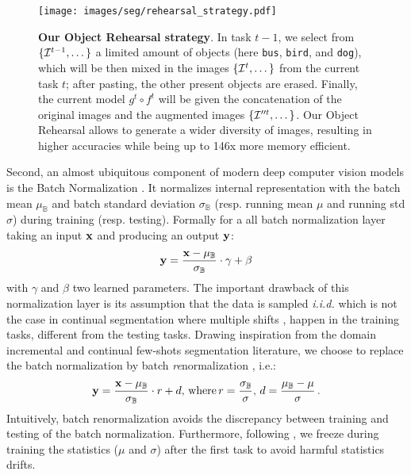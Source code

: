 \begin{figure}[ht!]
    \centering
    \texttt{[image: images/seg/rehearsal\_strategy.pdf]}
    \caption{\textbf{Our Object Rehearsal strategy}. In task $t-1$, we select from $\{\mathcal{I}^{t-1},
            \dots \}$ a limited amount of objects (here \texttt{bus}, \texttt{bird}, and
        \texttt{dog}), which will be then mixed in the images $\{\mathcal{I}^{t}, \dots \}$ from the
        current task $t$; after pasting, the other present objects are erased. Finally, the
        current model $g^t \circ f^t$ will be given the concatenation of the original images
        and the augmented images $\{\mathcal{I}''^t, \dots\}$. Our Object Rehearsal allows to generate
        a wider diversity of images, resulting in higher accuracies while being up to 146x more
        memory efficient.}
    \label{fig:seg_model_objectrehearsal}
\end{figure}

Second, an almost ubiquitous component of modern deep computer vision models is the Batch
Normalization \citep{ioffe2015batchnorm}. It normalizes internal representation with the batch mean
$\mu_\mathbb{B}$ and batch standard deviation $\sigma_\mathbb{B}$ (resp. running mean $\mu$ and
running std $\sigma$) during training (resp. testing). Formally for a all batch normalization layer
taking an input $\mathbf{x}$ and producing an output $\mathbf{y}$:
%
\begin{equation}
    \mathbf{y} = \frac{\mathbf{x} - \mu_\mathbb{B}}{\sigma_\mathbb{B}} \cdot \gamma + \beta
    \label{eq:seg_batch_norm}
\end{equation}
%
with $\gamma$ and $\beta$ two learned parameters. The important drawback of this normalization layer
is its assumption that the data is sampled \textit{i.i.d.} which is not the case in continual
segmentation where multiple shifts
\citep{morenotorresa2012datasetshift,lesort2021driftanalysis,douillardlesort2021continuum}, happen in
the training tasks, different from the testing tasks. Drawing inspiration from the domain
incremental \citep{lomonaco2020ar1} and continual few-shots segmentation
\citep{cermelli2020fewshotcontinualsegm} literature, we choose to replace the batch normalization by
batch \textit{re}normalization \citep{ioffe2017batchrenorm}, i.e.:
%
\begin{equation}
    \mathbf{y} = \frac{\mathbf{x} - \mu_\mathbb{B}}{\sigma_\mathbb{B}} \cdot r + d,\,\text{where}\, r = \frac{\sigma_\mathbb{B}}{\sigma},\, d = \frac{\mu_\mathbb{B} - \mu}{\sigma}\,.
    \label{eq:seg_batch_renorm}
\end{equation}
%
Intuitively, batch renormalization avoids the discrepancy between training and testing of the batch
normalization. Furthermore, following \cite{cermelli2020fewshotcontinualsegm}, we freeze during
training the statistics ($\mu$ and $\sigma$) after the first task to avoid harmful statistics
drifts.

